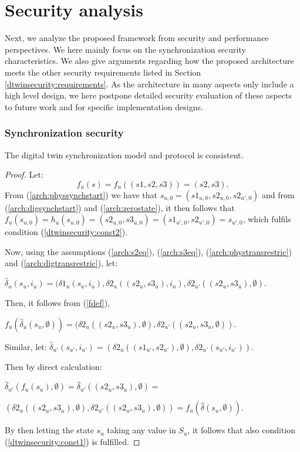 \section{Security analysis}
\label{analysis}
Next, we analyze the proposed framework from security and performance perspectives. We here mainly focus on the synchronization security characteristics. We also give arguments regarding how the proposed architecture meets the other security requirements listed in Section \ref{dtwinsecurity:requirements}. As the architecture in many aspects only include a high level design, we here postpone detailed security evaluation of these aspects to future work and for specific implementation designs. 
\subsubsection{Synchronization security}
\begin{prop}
\label{analysis:synchsec}
The digital twin synchronization model and protocol is consistent.
\end{prop}
\begin{proof}
Let:
\begin{equation}
f_u(s) = f_u((s1,s2,s3)) = (s2,s3). \label{fdef}
\end{equation}
From (\ref{arch:physsynchstart}) we have that $s_{u,0} = (s1_{u,0},s2_{u,0},s2_{u',0})$ and from (\ref{arch:digsynchstart}) and (\ref{arch:zerostate}), it then follows that $f_u(s_{u,0}) = h_u(s_{u,0}) =  (s2_{u,0},s3_{u,0}) = (s1_{u',0},s2_{u',0}) = s_{u',0}$, which fulfils condition (\ref{dtwinsecurity:const2}).

\noindent
Now, using the assumptions (\ref{arch:s2eq}),  (\ref{arch:s3eq}), (\ref{arch:phystransrestric}) and (\ref{arch:digtransrestric}), let:

$\hat{\delta}_u(s_u,i_u) = (\delta1_u(s_u,i_u), \delta2_u((s2_u,s3_u),i_u), \delta2_{u'}((s2_u,s3_u),\emptyset)$.

\noindent
Then, it follows from (\ref{fdef}),

$f_u(\hat{\delta}_u(s_u,\emptyset)) = (\delta2_u((s2_u,s3_u),\emptyset), \delta2_{u'}((s2_u,s3_u,\emptyset))$. 

\noindent
Similar, let:
$\hat{\delta}_{u'}(s_{u'},i_{u'}) = (\delta2_u((s1_{u'},s2_{u'}),\emptyset),\delta2_{u'}(s_{u'},i_{u'}))$. 

\noindent
Then by direct calculation:

$\hat{\delta}_{u'}(f_u(s_u),\emptyset) = \hat{\delta}_{u'}((s2_u,s3_u),\emptyset) = $ 

$(\delta2_u((s2_u,s3_u),\emptyset),\delta2_{u'}((s2_u,s3_u),\emptyset)) = f_u(\hat{\delta}(s_u,\emptyset))$.

\noindent
 By then letting the state $s_u$ taking any value in $S_u$, it follows that also condition (\ref{dtwinsecurity:const1}) is fulfilled.
\end{proof}
